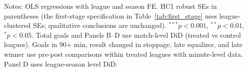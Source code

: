 \begin{table}[htbp]
\begin{threeparttable}
\begin{tablenotes}
\small
\item Notes: OLS regressions with league and season FE. HC1 robust SEs in parentheses (the first-stage specification in Table~\ref{tab:first_stage} uses league-clustered SEs; qualitative conclusions are unchanged).
$^{***}p<0.001$, $^{**}p<0.01$, $^{*}p<0.05$.
Total goals and Panels B--D use match-level DiD (treated vs control leagues).
Goals in 90+ min, result changed in stoppage, late equalizer, and late winner use pre-post comparisons within treated leagues with minute-level data.
Panel D uses league-season level DiD.
\end{tablenotes}
\end{threeparttable}
\end{table}